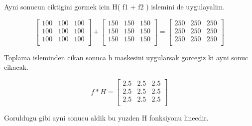 \documentclass[12pt]{article}
\begin{document}
Ayni sonucun ciktigini gormek icin H( f1 + f2 ) islemini de uygulayalim.

$$\begin{bmatrix}
 100&  100&  100\\ 
 100&  100&  100\\ 
 100&  100&  100\\ 
\end{bmatrix} +
 \begin{bmatrix}
 150&  150&  150\\ 
 150&  150&  150\\ 
 150&  150&  150\\ 
\end{bmatrix} = 
 \begin{bmatrix}
 250&  250&  250\\ 
 250&  250&  250\\ 
 250&  250&  250\\ 
\end{bmatrix}$$ 

Toplama isleminden cikan sonuca h maskesini uygularsak gorcegiz ki ayni sonuc cikacak.

$$ f*H =  \begin{bmatrix}
 2.5&  2.5&  2.5\\ 
 2.5&  2.5&  2.5\\ 
 2.5&  2.5&  2.5\\ 
\end{bmatrix}$$ 

Goruldugu gibi ayni sonucu aldik bu yuzden H fonksiyonu lineedir.
\end{document}
